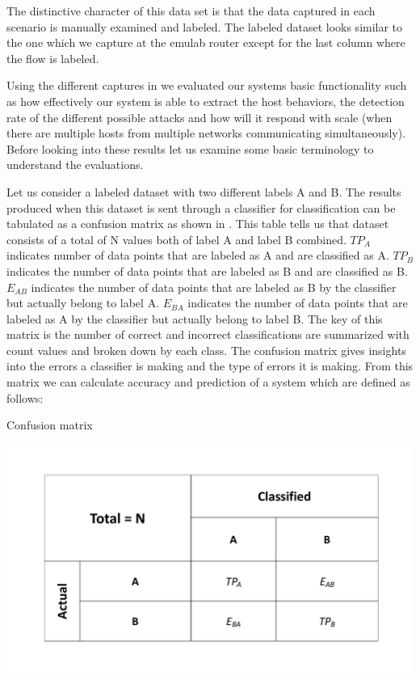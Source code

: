   The distinctive character of this data set is that the data captured in each scenario is manually examined and labeled. The labeled dataset looks similar to the one which we capture at the emulab router except for the last column where the flow is labeled.

Using the different captures in   we evaluated our systems basic functionality such as how effectively our system is able to extract the host behaviors, the detection rate of the different possible attacks and how will it respond with scale (when there are multiple hosts from multiple networks communicating simultaneously). Before looking into these results let us examine some basic terminology to understand the evaluations.


Let us consider a labeled dataset with two different labels A and B. The results produced when this dataset is sent through a classifier for classification can be tabulated as a confusion matrix as shown in . This table tells us that dataset consists of a total of N values both of label A and label B combined. $TP_A$ indicates number of data points that are labeled as A and are classified as A. $TP_B$ indicates the number of data points that are labeled as B and are classified as B. $E_{AB}$ indicates the number of data points that are labeled as B by the classifier but actually belong to label A. $E_{BA}$ indicates the number of data points that are labeled as A by the classifier but actually belong to label B. The key of this matrix is the number of correct and incorrect classifications are summarized with count values and broken down by each class. The confusion matrix gives insights into the errors a classifier is making and the type of errors it is making. From this matrix we can calculate accuracy and prediction of a system which are defined as follows:

\begin{table}[t]
	
	\caption{Confusion matrix}%
	\centerline{\includegraphics[scale = 0.5]{confusion.pdf}}	
\end{table}

